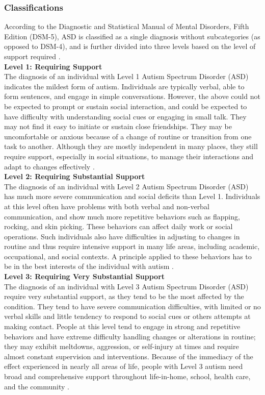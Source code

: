\documentclass[a4paper,12pt]{report}
\begin{document}
\subsubsection{Classifications}
According to the Diagnostic and Statistical Manual of Mental Disorders, Fifth Edition (DSM-5), ASD is classified as a single diagnosis without subcategories (as opposed to DSM-4), and is further divided into three levels based on the level of support required \cite{behavioralinnovations_types_levels_ASD}.\\[0.3cm]
\clearpage
\textbf{Level 1: Requiring Support} \\[0.3cm]
The diagnosis of an individual with Level 1 Autism Spectrum Disorder (ASD) indicates the mildest form of autism. Individuals are typically verbal, able to form sentences, and engage in simple conversations. However, the above could not be expected to prompt or sustain social interaction, and could be expected to have difficulty with understanding social cues or engaging in small talk. They may not find it easy to initiate or sustain close friendships. They may be uncomfortable or anxious because of a change of routine or transition from one task to another. Although they are mostly independent in many places, they still require support, especially in social situations, to manage their interactions and adapt to changes effectively \cite{behavioralinnovations_types_levels_ASD}. \\[0.3cm]
\textbf{Level 2: Requiring Substantial Support}\\[0.3cm]
The diagnosis of an individual with Level 2 Autism Spectrum Disorder (ASD) has much more severe communication and social deficits than Level 1. Individuals at this level often have problems with both verbal and non-verbal communication, and show much more repetitive behaviors such as flapping, rocking, and skin picking. These behaviors can affect daily work or social operations. Such individuals also have difficulties in adjusting to changes in routine and thus require intensive support in many life areas, including academic, occupational, and social contexts. A principle applied to these behaviors has to be in the best interests of the individual with autism \cite{behavioralinnovations_types_levels_ASD}.  \\[0.3cm]
\textbf{Level 3: Requiring Very Substantial Support}\\[0.3cm]
The diagnosis of an individual with Level 3 Autism Spectrum Disorder (ASD) require very substantial support, as they tend to be the most affected by the condition. They tend to have severe communication difficulties, with limited or no verbal skills and little tendency to respond to social cues or others attempts at making contact. People at this level tend to engage in strong and repetitive behaviors and have extreme difficulty handling changes or alterations in routine; they may exhibit meltdowns, aggression, or self-injury at times and require almost constant supervision and interventions. Because of the immediacy of the effect experienced in nearly all areas of life, people with Level 3 autism need broad and comprehensive support throughout life-in-home, school, health care, and the community \cite{behavioralinnovations_types_levels_ASD}. \\[0.3cm]
\end{document}

